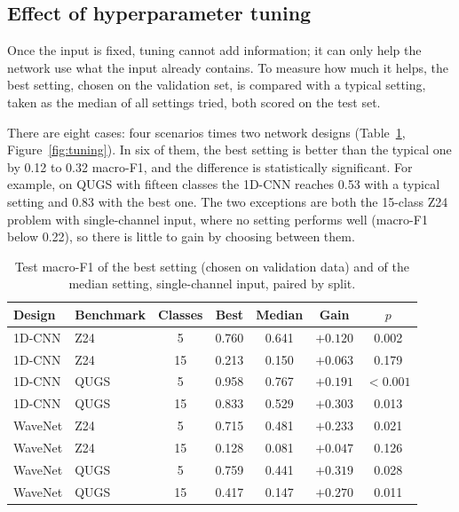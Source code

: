 \documentclass[11pt,a4paper]{article}
\begin{document}
\subsection{Effect of hyperparameter tuning}\label{sec:tuning}

Once the input is fixed, tuning cannot add information; it can only help the network use what the input already contains. To measure how much it helps, the best setting, chosen on the validation set, is compared with a typical setting, taken as the median of all settings tried, both scored on the test set.

There are eight cases: four scenarios times two network designs (Table~\ref{tab:tuning}, Figure~\ref{fig:tuning}). In six of them, the best setting is better than the typical one by 0.12 to 0.32 macro-F1, and the difference is statistically significant. For example, on QUGS with fifteen classes the 1D-CNN reaches 0.53 with a typical setting and 0.83 with the best one. The two exceptions are both the 15-class Z24 problem with single-channel input, where no setting performs well (macro-F1 below 0.22), so there is little to gain by choosing between them.

\begin{table}[htbp]
  \centering
  \caption{Test macro-F1 of the best setting (chosen on validation data) and of the median setting, single-channel input, paired by split.}
  \label{tab:tuning}
  \small
  \begin{tabular}{@{}llc ccc c@{}}
    \toprule
    Design & Benchmark & Classes & Best & Median & Gain & $p$ \\
    \midrule
    1D-CNN  & Z24  & 5  & 0.760 & 0.641 & $\mathbf{+0.120}$ & 0.002 \\
    1D-CNN  & Z24  & 15 & 0.213 & 0.150 & $+0.063$ & 0.179 \\
    1D-CNN  & QUGS & 5  & 0.958 & 0.767 & $\mathbf{+0.191}$ & $<0.001$ \\
    1D-CNN  & QUGS & 15 & 0.833 & 0.529 & $\mathbf{+0.303}$ & 0.013 \\
    WaveNet & Z24  & 5  & 0.715 & 0.481 & $\mathbf{+0.233}$ & 0.021 \\
    WaveNet & Z24  & 15 & 0.128 & 0.081 & $+0.047$ & 0.126 \\
    WaveNet & QUGS & 5  & 0.759 & 0.441 & $\mathbf{+0.319}$ & 0.028 \\
    WaveNet & QUGS & 15 & 0.417 & 0.147 & $\mathbf{+0.270}$ & 0.011 \\
    \bottomrule
  \end{tabular}
\end{table}
\end{document}
